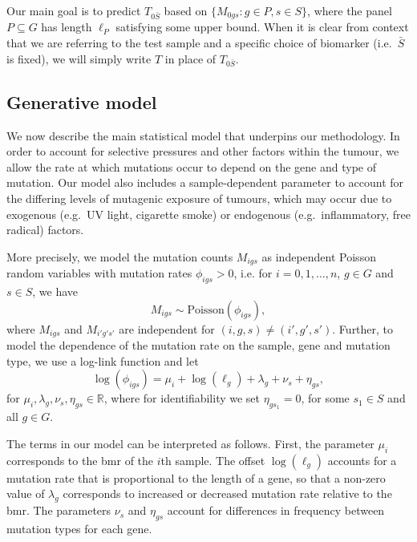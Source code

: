 \documentclass[12pt]{article}
\begin{document}
Our main goal is to predict $T_{0\bar{S}}$ based on $\{M_{0gs}: g \in P, s \in S\}$, where the panel $P \subseteq G$ has length $\ell_P$ satisfying some upper bound. When it is clear from context that we are referring to the test sample and a specific choice of biomarker (i.e.~$\bar{S}$ is fixed), we will simply write $T$ in place of $T_{0\bar{S}}$. 

\subsection{Generative model \label{sec:genmodel}}
We now describe the main statistical model that underpins our methodology. In order to account for selective pressures and other factors within the tumour, we allow the rate at which mutations occur to depend on the gene and type of mutation. Our model also includes a sample-dependent parameter to account for the differing levels of mutagenic exposure of tumours, which may occur due to exogenous (e.g.~UV light, cigarette smoke) or endogenous (e.g.~inflammatory, free radical) factors.  

More precisely, we model the mutation counts $M_{igs}$ as independent Poisson random variables with mutation rates $\phi_{igs} > 0$, i.e. for $i = 0, 1, \ldots, n$, $g \in G$ and $s \in S$, we have
\begin{equation}
    \label{eq:Poisson}
M_{igs} \sim \mathrm{Poisson}(\phi_{igs}),
\end{equation}
where $M_{igs}$ and $M_{i'g's'}$ are independent for $(i,g,s) \neq (i',g',s')$.  Further, to model the dependence of the mutation rate on the sample, gene and mutation type, we use a log-link function and let 
\begin{equation}
    \label{eq:loglink}
\log(\phi_{igs}) =  \mu_i + \log(\ell_g) + \lambda_g + \nu_s + \eta_{gs},
\end{equation} 
for $\mu_i, \lambda_{g},\nu_{s},\eta_{gs} \in \mathbb{R}$, where for identifiability we set $\eta_{gs_1} = 0$, for  some $s_1 \in S$ and all $g \in G$. 

The terms in our model can be interpreted as follows. First, the parameter $\mu_i$ corresponds to the \acrshort{bmr} of the $i$th sample. The offset $\log(\ell_g)$ accounts for a mutation rate that is proportional to the length of a gene, so that a non-zero value of $\lambda_g$ corresponds to increased or decreased mutation rate relative to the \acrshort{bmr}.  The parameters $\nu_s$ and $\eta_{gs}$ account for differences in frequency between mutation types for each gene. 
\end{document}
